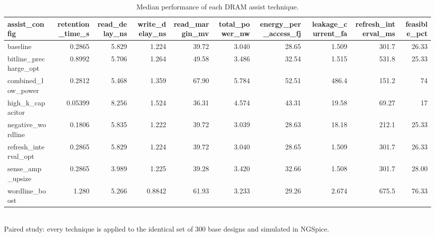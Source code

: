 \begin{table}[!t]
\centering
\caption{Median performance of each DRAM assist technique.}
\label{tab:assist_summary_main}
\footnotesize
\begin{tabular}{lrrrrrrrrr}
\toprule
assist\_config & retention\_time\_s & read\_delay\_ns & write\_delay\_ns & read\_margin\_mv & total\_power\_nw & energy\_per\_access\_fj & leakage\_current\_fa & refresh\_interval\_ms & feasible\_pct \\
\midrule
baseline & 0.2865 & 5.829 & 1.224 & 39.72 & 3.040 & 28.65 & 1.509 & 301.7 & 26.33 \\
bitline\_precharge\_opt & 0.8992 & 5.706 & 1.264 & 49.58 & 3.486 & 32.54 & 1.515 & 531.8 & 25.33 \\
combined\_low\_power & 0.2812 & 5.468 & 1.359 & 67.90 & 5.784 & 52.51 & 486.4 & 151.2 & 74 \\
high\_k\_capacitor & 0.05399 & 8.256 & 1.524 & 36.31 & 4.574 & 43.31 & 19.58 & 69.27 & 17 \\
negative\_wordline & 0.1806 & 5.835 & 1.222 & 39.72 & 3.039 & 28.63 & 18.18 & 212.1 & 25.33 \\
refresh\_interval\_opt & 0.2865 & 5.829 & 1.224 & 39.72 & 3.040 & 28.65 & 1.509 & 301.7 & 26.33 \\
sense\_amp\_upsize & 0.2865 & 3.989 & 1.225 & 39.28 & 3.420 & 32.66 & 1.508 & 301.7 & 28.00 \\
wordline\_boost & 1.280 & 5.266 & 0.8842 & 61.93 & 3.233 & 29.26 & 2.674 & 675.5 & 76.33 \\
\bottomrule
\end{tabular}
\\[2pt] \footnotesize Paired study: every technique is applied to the identical set of 300 base designs and simulated in NGSpice.
\end{table}
